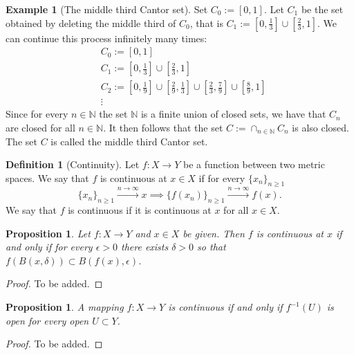 \documentclass[11pt,a4paper]{article}
\theoremstyle{definition}
\newtheorem{definition}{Definition}[section]
\newtheorem{example}{Example}[section]
\theoremstyle{plain}
\newtheorem{proposition}[theorem]{Proposition}
\newcommand{\N}{\mathbb{N}}
\begin{document}
  \begin{example}[The middle third Cantor set]
    Set $C_0 := [0,1]$. Let $C_1$ be the set obtained by deleting the
    middle third of $C_0$, that is 
    $C_1 := \left[0,\frac 13\right] \cup \left[\frac 23,1\right]$.
    We can continue this process infinitely many times:
    \begin{align*}
      &C_0 := [0,1] \\
      &C_1 := \left[0,\frac 13\right] \cup \left[\frac 23,1\right] \\
      &C_2 := 
      \left[0, \frac 19\right] \cup
      \left[\frac 29, \frac 13\right] \cup
      \left[\frac 23, \frac 79\right] \cup
      \left[\frac 89, 1\right] \\
      &\vdots
    \end{align*}
    Since for every $n \in \N$ the set $\N$ is a finite union of closed
    sets, we have that $C_n$ are closed for all $n \in \N$. It then
    follows that the set $C := \cap_{n \in \N} C_n$ is also closed.
    The set $C$ is called the middle third Cantor set.
  \end{example}

  \begin{definition}[Continuity]
    Let $f \colon X \to Y$ be a function between two metric spaces.
    We say that $f$ is continuous at $x \in X$ if for every $\{x_n\}_{n \geq 1}$
    \[
      \{x_n\}_{n \geq 1} \xrightarrow{n \to \infty} x \implies 
      \{f(x_n)\}_{n \geq 1} \xrightarrow{n \to \infty} f(x).
    \]
    We say that $f$ is continuous if it is continuous at $x$ for all
    $x \in X$.
  \end{definition}

  \begin{proposition}
    Let $f \colon X \to Y$ and $x \in X$ be given. Then $f$ is continuous
    at $x$ if and only if for every $\epsilon > 0$ there exists $\delta > 0$
    so that $f(B(x,\delta)) \subset B(f(x),\epsilon)$.
  \end{proposition}
  \begin{proof}
    To be added.
  \end{proof}

  \begin{proposition}
    A mapping $f \colon X \to Y$ is continuous if and only if $f^{-1}(U)$
    is open for every open $U \subset Y$.
  \end{proposition}
  \begin{proof}
    To be added.
  \end{proof}
\end{document}
